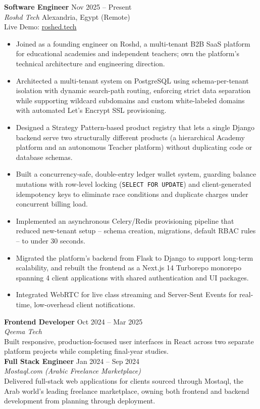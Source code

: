 \documentclass[10.5pt,letterpaper]{article}
\newcommand{\entryHeading}[4]{%
  \textbf{#1} \hfill {\small\color{muted}#2}\\
  {\small\color{muted}\textit{#3}} \hfill {\small\color{muted}#4}\\[1pt]
}
\newcommand{\linkLine}[3]{{\small\color{muted}#1: }{\small\href{#2}{#3}}\\[2pt]}
\newcommand{\shortEntry}[4]{%
  \textbf{#1} \hfill {\small\color{muted}#2}\\
  {\small\color{muted}\textit{#3}}\\
  {\small #4}\\[3pt]
}
\begin{document}
\entryHeading{Software Engineer}{Nov 2025 -- Present}{Roshd Tech}{Alexandria, Egypt (Remote)}
\linkLine{Live Demo}{https://roshed.tech/}{roshed.tech}
\begin{itemize}
    \item Joined as a founding engineer on Roshd, a multi-tenant B2B SaaS platform for educational academies and
    independent teachers; own the platform's technical architecture and engineering direction.
    \item Architected a multi-tenant system on PostgreSQL using schema-per-tenant isolation with dynamic search-path
    routing, enforcing strict data separation while supporting wildcard subdomains and custom white-labeled domains
    with automated Let's Encrypt SSL provisioning.
    \item Designed a Strategy Pattern-based product registry that lets a single Django backend serve two structurally
    different products (a hierarchical Academy platform and an autonomous Teacher platform) without duplicating code
    or database schemas.
    \item Built a concurrency-safe, double-entry ledger wallet system, guarding balance mutations with row-level
    locking (\texttt{SELECT FOR UPDATE}) and client-generated idempotency keys to eliminate race conditions and
    duplicate charges under concurrent billing load.
    \item Implemented an asynchronous Celery/Redis provisioning pipeline that reduced new-tenant setup -- schema
    creation, migrations, default RBAC rules -- to under 30 seconds.
    \item Migrated the platform's backend from Flask to Django to support long-term scalability, and rebuilt the
    frontend as a Next.js 14 Turborepo monorepo spanning 4 client applications with shared authentication and UI
    packages.
    \item Integrated WebRTC for live class streaming and Server-Sent Events for real-time, low-overhead client
    notifications.
\end{itemize}

\shortEntry{Frontend Developer}{Oct 2024 -- Mar 2025}{Qeema Tech}{Built responsive, production-focused user interfaces in React across two separate platform projects while completing final-year studies.}

\shortEntry{Full Stack Engineer}{Jan 2024 -- Sep 2024}{Mostaql.com (Arabic Freelance Marketplace)}{Delivered full-stack web applications for clients sourced through Mostaql, the Arab world's leading freelance marketplace, owning both frontend and backend development from planning through deployment.}
\end{document}
